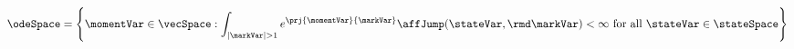 \begin{definition}
  \begin{equation}
    \odeSpace 
    = \left\{ \momentVar \in \vecSpace : \int_{|\markVar|>1} e^\prj{\momentVar}{\markVar} \affJump(\stateVar, \rmd\markVar) < \infty \text{ for all }\stateVar \in \stateSpace \right\}
  \end{equation}
\end{definition}
